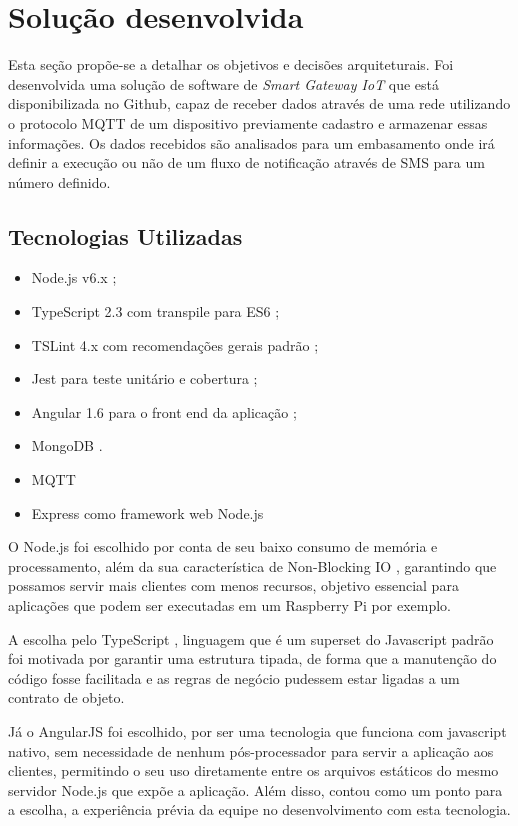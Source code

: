 \section{Solução desenvolvida}
\label{sec:iotGateway}

Esta seção propõe-se a detalhar os objetivos e decisões arquiteturais. Foi desenvolvida uma solução de software de \textit{Smart Gateway IoT} que está disponibilizada no Github, capaz de receber dados através de uma rede utilizando o protocolo MQTT de um dispositivo previamente cadastro e armazenar essas informações. Os dados recebidos são analisados para um embasamento onde irá definir a execução ou não de um fluxo de notificação através de SMS para um número definido.

\subsection{Tecnologias Utilizadas} 
\begin{itemize}
	\item Node.js v6.x \cite{NodeJS};
	\item TypeScript 2.3 com transpile para ES6 \cite{Typescript};
	\item TSLint 4.x com recomendações gerais padrão \cite{TSLint};
	\item Jest para teste unitário e cobertura \cite{Jest};
	\item Angular 1.6 para o front end da aplicação \cite{AngularJS};
	\item MongoDB \cite{MongoDB}.
	\item MQTT \cite{Mqtt}
	\item Express como framework web Node.js \cite{ExpressJS}
\end{itemize}

O Node.js \cite{NodeJS} foi escolhido por conta de seu baixo consumo de memória e processamento, além da sua característica de Non-Blocking IO \cite{NodeJSNonBlockingIO}, garantindo que possamos servir mais clientes com menos recursos, objetivo essencial para aplicações que podem ser executadas em um Raspberry Pi por exemplo.

A escolha pelo TypeScript \cite{Typescript}, linguagem que é um superset do Javascript padrão foi motivada por garantir uma estrutura tipada, de forma que a manutenção do código fosse facilitada e as regras de negócio pudessem estar ligadas a um contrato de objeto.

Já o AngularJS \cite{AngularJS} foi escolhido, por ser uma tecnologia que funciona com javascript nativo, sem necessidade de nenhum pós-processador para servir a aplicação aos clientes, permitindo o seu uso diretamente entre os arquivos estáticos do mesmo servidor Node.js que expõe a aplicação. Além disso, contou como um ponto para a escolha, a experiência prévia da equipe no desenvolvimento com esta tecnologia.

